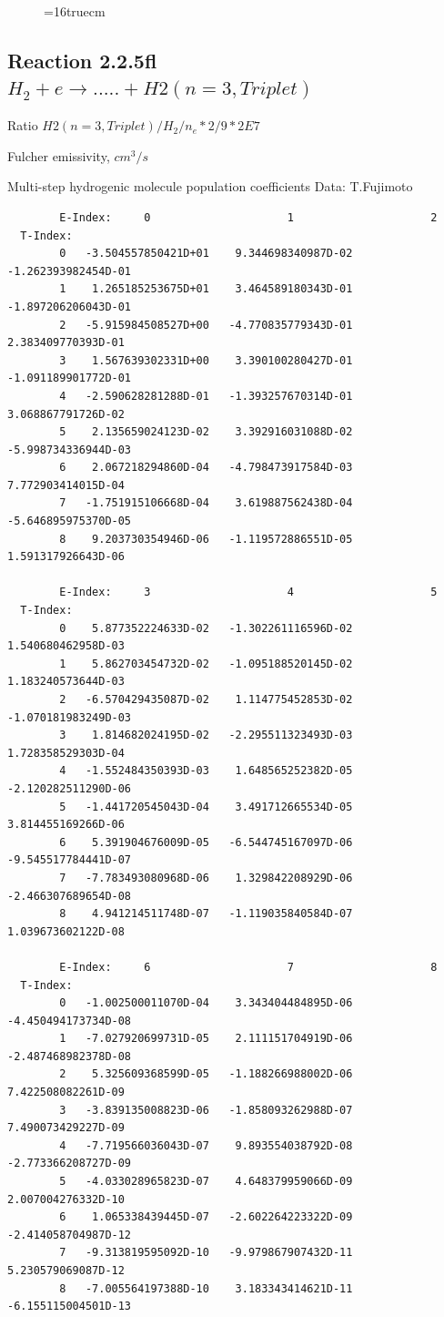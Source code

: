 \documentclass[12pt,dvips]{article}
\begin{document}
\begin{figure} \label{2.2.5e}
\epsfxsize=16truecm
\end{figure}

\newpage
\subsection{
Reaction 2.2.5fl $H_2 + e \rightarrow .....+H2(n=3,Triplet)$}

Ratio $H2(n=3, Triplet)/H_2/n_e*2/9*2E7 $

 Fulcher emissivity, $cm^3/s$

 Multi-step hydrogenic molecule population coefficients
 Data: T.Fujimoto

\begin{small}\begin{verbatim}
        E-Index:     0                     1                     2
  T-Index:
        0   -3.504557850421D+01    9.344698340987D-02   -1.262393982454D-01
        1    1.265185253675D+01    3.464589180343D-01   -1.897206206043D-01
        2   -5.915984508527D+00   -4.770835779343D-01    2.383409770393D-01
        3    1.567639302331D+00    3.390100280427D-01   -1.091189901772D-01
        4   -2.590628281288D-01   -1.393257670314D-01    3.068867791726D-02
        5    2.135659024123D-02    3.392916031088D-02   -5.998734336944D-03
        6    2.067218294860D-04   -4.798473917584D-03    7.772903414015D-04
        7   -1.751915106668D-04    3.619887562438D-04   -5.646895975370D-05
        8    9.203730354946D-06   -1.119572886551D-05    1.591317926643D-06

        E-Index:     3                     4                     5
  T-Index:
        0    5.877352224633D-02   -1.302261116596D-02    1.540680462958D-03
        1    5.862703454732D-02   -1.095188520145D-02    1.183240573644D-03
        2   -6.570429435087D-02    1.114775452853D-02   -1.070181983249D-03
        3    1.814682024195D-02   -2.295511323493D-03    1.728358529303D-04
        4   -1.552484350393D-03    1.648565252382D-05   -2.120282511290D-06
        5   -1.441720545043D-04    3.491712665534D-05    3.814455169266D-06
        6    5.391904676009D-05   -6.544745167097D-06   -9.545517784441D-07
        7   -7.783493080968D-06    1.329842208929D-06   -2.466307689654D-08
        8    4.941214511748D-07   -1.119035840584D-07    1.039673602122D-08

        E-Index:     6                     7                     8
  T-Index:
        0   -1.002500011070D-04    3.343404484895D-06   -4.450494173734D-08
        1   -7.027920699731D-05    2.111151704919D-06   -2.487468982378D-08
        2    5.325609368599D-05   -1.188266988002D-06    7.422508082261D-09
        3   -3.839135008823D-06   -1.858093262988D-07    7.490073429227D-09
        4   -7.719566036043D-07    9.893554038792D-08   -2.773366208727D-09
        5   -4.033028965823D-07    4.648379959066D-09    2.007004276332D-10
        6    1.065338439445D-07   -2.602264223322D-09   -2.414058704987D-12
        7   -9.313819595092D-10   -9.979867907432D-11    5.230579069087D-12
        8   -7.005564197388D-10    3.183343414621D-11   -6.155115004501D-13


\end{verbatim}
\end{small}
\end{document}
